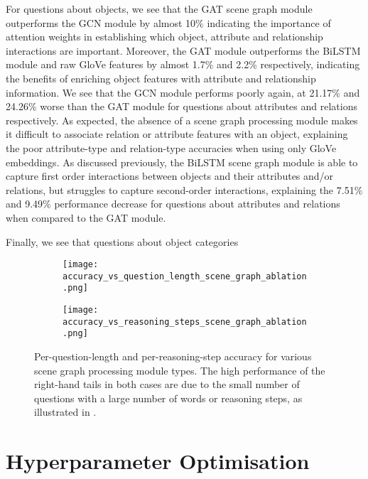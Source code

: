 For questions about objects, we see that the GAT scene graph module outperforms the GCN module by almost 10\% indicating the importance of attention weights in establishing which object, attribute and relationship interactions are important. Moreover, the GAT module outperforms the BiLSTM module and raw GloVe features by almost 1.7\% and 2.2\% respectively, indicating the benefits of enriching object features with attribute and relationship information. We see that the GCN module performs poorly again, at 21.17\% and 24.26\% worse than the GAT module for questions about attributes and relations respectively. As expected, the absence of a scene graph processing module makes it difficult to associate relation or attribute features with an object, explaining the poor attribute-type and relation-type accuracies when using only GloVe embeddings. As discussed previously, the BiLSTM scene graph module is able to capture first order interactions between objects and their attributes and/or relations, but struggles to capture second-order interactions, explaining the 7.51\% and 9.49\% performance decrease for questions about attributes and relations when compared to the GAT module.

Finally, we see that questions about object categories


\begin{figure}[htbp]
    \centering
    \begin{subfigure}[l]{0.5\textwidth}
        \texttt{[image: accuracy\_vs\_question\_length\_scene\_graph\_ablation.png]}
        \label{fig:accuracy_vs_question_length_scene_graph_ablation}
    \end{subfigure}
    \begin{subfigure}[r]{0.49\textwidth}
        \texttt{[image: accuracy\_vs\_reasoning\_steps\_scene\_graph\_ablation.png]}
        \label{fig:accuracy_vs_reasoning_steps_scene_graph_ablation}
    \end{subfigure}
    \caption{Per-question-length and per-reasoning-step accuracy for various scene graph processing module types. The high performance of the right-hand tails in both cases are due to the small number of questions with a large number of words or reasoning steps, as illustrated in \figureautorefname{ \ref{fig:test_reasoning_step_and_question_length_distribution}}.}
\end{figure}

\section{Hyperparameter Optimisation}
\label{sec:hyperparameter_optimisation}

